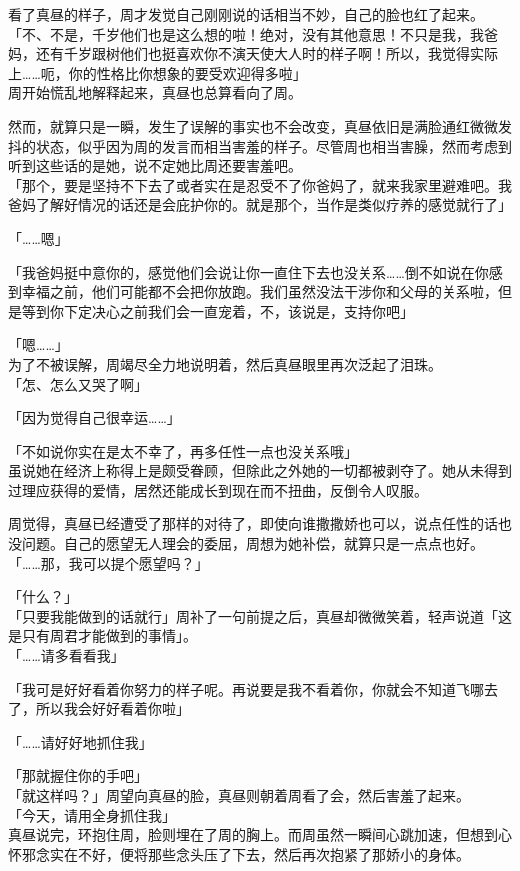 看了真昼的样子，周才发觉自己刚刚说的话相当不妙，自己的脸也红了起来。\\

「不、不是，千岁他们也是这么想的啦！绝对，没有其他意思！不只是我，我爸妈，还有千岁跟树他们也挺喜欢你不演天使大人时的样子啊！所以，我觉得实际上……呃，你的性格比你想象的要受欢迎得多啦」\\

周开始慌乱地解释起来，真昼也总算看向了周。

然而，就算只是一瞬，发生了误解的事实也不会改变，真昼依旧是满脸通红微微发抖的状态，似乎因为周的发言而相当害羞的样子。尽管周也相当害臊，然而考虑到听到这些话的是她，说不定她比周还要害羞吧。\\

「那个，要是坚持不下去了或者实在是忍受不了你爸妈了，就来我家里避难吧。我爸妈了解好情况的话还是会庇护你的。就是那个，当作是类似疗养的感觉就行了」

「……嗯」

「我爸妈挺中意你的，感觉他们会说让你一直住下去也没关系……倒不如说在你感到幸福之前，他们可能都不会把你放跑。我们虽然没法干涉你和父母的关系啦，但是等到你下定决心之前我们会一直宠着，不，该说是，支持你吧」

「嗯……」\\

为了不被误解，周竭尽全力地说明着，然后真昼眼里再次泛起了泪珠。\\

「怎、怎么又哭了啊」

「因为觉得自己很幸运……」

「不如说你实在是太不幸了，再多任性一点也没关系哦」\\

虽说她在经济上称得上是颇受眷顾，但除此之外她的一切都被剥夺了。她从未得到过理应获得的爱情，居然还能成长到现在而不扭曲，反倒令人叹服。

周觉得，真昼已经遭受了那样的对待了，即使向谁撒撒娇也可以，说点任性的话也没问题。自己的愿望无人理会的委屈，周想为她补偿，就算只是一点点也好。\\

「……那，我可以提个愿望吗？」

「什么？」\\

「只要我能做到的话就行」周补了一句前提之后，真昼却微微笑着，轻声说道「这是只有周君才能做到的事情」。\\

「……请多看看我」

「我可是好好看着你努力的样子呢。再说要是我不看着你，你就会不知道飞哪去了，所以我会好好看着你啦」

「……请好好地抓住我」

「那就握住你的手吧」\\

「就这样吗？」周望向真昼的脸，真昼则朝着周看了会，然后害羞了起来。\\

「今天，请用全身抓住我」\\

真昼说完，环抱住周，脸则埋在了周的胸上。而周虽然一瞬间心跳加速，但想到心怀邪念实在不好，便将那些念头压了下去，然后再次抱紧了那娇小的身体。
